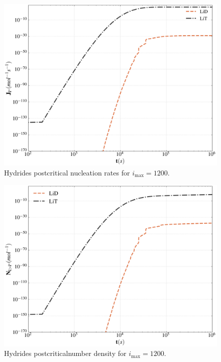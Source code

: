 \begin{figure}[H]
    \centering
    \includegraphics[width=1.1\linewidth]{postcritical_rate_lih.png}
    \caption{Hydrides postcritical nucleation rates for $i_{\text{max}} = 1200$.}
    \label{fig:psd_cr}
\end{figure}

\begin{figure}[H]
    \centering
    \includegraphics[width=1.1\linewidth]{postcritical_number_lih.png}
    \caption{Hydrides postcriticalnumber density for $i_{\text{max}} = 1200$.}
    \label{fig:psd_cr}
\end{figure}

